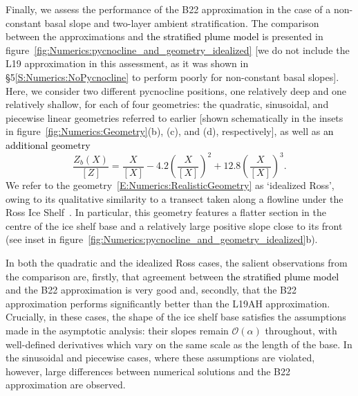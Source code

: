 \documentclass[openacc]{rsproca_new}%
\newcommand{\order}[1]{\mathcal{O}(#1)}
\newcommand{\red}[1]{{\color{red} #1}}
\newcommand{\blue}[1]{{\color{blue} #1}}
\newcommand{\rout}[1]{\red{\st{#1}}}\newcommand{\ab}[1]{\textcolor{Green}{#1}}\newcommand{\about}[1]{\textcolor{Cyan}{\sout{#1}}}
\renewcommand{\rout}[1]{{}} %
\renewcommand{\blue}[1]{{\textcolor{black}{#1}}} %
\renewcommand{\red}[1]{{}} %
\begin{document}
Finally, we assess the performance of the B22 approximation in the case of a non-constant basal slope and two-layer ambient stratification. The comparison between the approximations and \blue{the stratified plume model} \rout{numerical solutions} is presented in figure~\ref{fig:Numerics:pycnocline_and_geometry_idealized} [we do not include the L19 approximation in this assessment, as it was shown in \S5\ref{S:Numerics:NoPycnocline} to perform poorly for non-constant basal slopes]. Here, we consider two different pycnocline positions, one relatively deep and one relatively shallow, for each of four geometries: the quadratic, sinusoidal, and piecewise linear geometries referred to earlier [shown schematically in the insets in figure~\ref{fig:Numerics:Geometry}(b), (c), and (d), respectively], as well as \rout{a fourth geometry} \blue{an additional geometry} 
\begin{equation}\label{E:Numerics:RealisticGeometry}
\frac{Z_b(X)}{\left[Z\right]}= \frac{X}{\left[X\right]} -4.2\left(\frac{X}{\left[X\right]}\right)^2 + 12.8\left(\frac{X}{\left[X\right]}\right)^3.
\end{equation}
We refer to the geometry~\eqref{E:Numerics:RealisticGeometry} as `idealized Ross', owing to its qualitative similarity to a transect taken along a flowline under the Ross Ice Shelf~\cite{Shabtaie1987JGeophysResSolidEarth}. In particular, this geometry features a flatter section in the centre of the ice shelf base and a relatively large positive slope close to its front (see inset in figure~\ref{fig:Numerics:pycnocline_and_geometry_idealized}b).

In both the quadratic and the idealized Ross cases, the salient observations from the comparison are, firstly, that agreement between \rout{numerical solutions}\blue{the stratified plume model} and the B22 approximation is very good and, secondly, that the B22 approximation performs significantly better than the L19AH approximation. Crucially, in these cases, the shape of the ice shelf base satisfies the assumptions made in the asymptotic analysis: their slopes remain $\order{\alpha}$ throughout, with well-defined derivatives which vary on the same scale as the length of the base. In the sinusoidal and piecewise cases, where these assumptions are violated, however, large differences between numerical solutions and the B22 approximation are observed.
\end{document}
